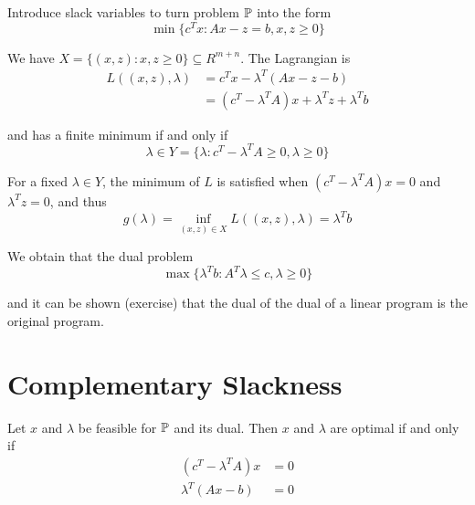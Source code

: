 Introduce slack variables to turn problem $\Prob$ into the form
\begin{equation}
  \label{eq:11}
  \min \{ c^{T} x : Ax - z = b, x, z \geq 0 \}
\end{equation}

We have $X = \{ (x, z) : x, z \geq 0 \} \subseteq R^{m + n}$.  
The Lagrangian is
\begin{align}
  L((x, z), \lambda) & = c^{T} x - \lambda^{T}(Ax - z - b) \\
                     & = (c^{T} - \lambda^{T}A)x + \lambda^{T} z + \lambda^{T} b
\end{align}

and has a finite minimum if and only if
\begin{equation}
  \label{eq:13}
  \lambda \in Y = \{ \lambda : c^{T} - \lambda^{T} A \geq 0, \lambda
  \geq 0 \}
\end{equation}

For a fixed  $\lambda \in Y$, the minimum of $L$ is satisfied when
$(c^{T} - \lambda^{T} A) x = 0$ and $\lambda^{T} z = 0$, and thus
\begin{equation}
  \label{eq:14}
  g(\lambda) = \inf_{(x, z) \in X} L((x, z), \lambda) = \lambda^{T} b
\end{equation}

We obtain that the dual problem
\begin{equation}
  \label{eq:15}
  \max \{ \lambda^{T} b : A^{T} \lambda \leq c, \lambda \geq 0 \}
\end{equation}

and it can be shown (exercise) that the dual of the dual of a linear
program is the original program.


\section{Complementary Slackness}
\label{sec:compl-slackn}

\begin{thm}
  \label{defn:linear_programming:4}
  Let $x$ and $\lambda$ be feasible for $\Prob$ and its dual.  Then
  $x$ and $\lambda$ are optimal if and only if
  \begin{align}
    \label{eq:16}
    (c^{T} - \lambda^{T}A)x & = 0 \\
    \lambda^{T}(Ax - b)     & = 0
  \end{align}
\end{thm}


